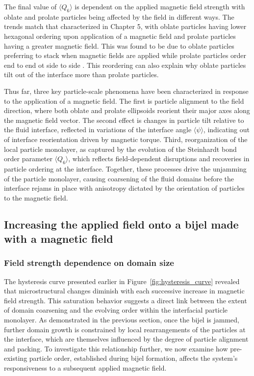 The final value of \(\langle Q_6 \rangle\) is dependent on the applied magnetic field strength with oblate and prolate particles being affected by the field in
different ways. The trends match that characterized in Chapter 5, with oblate particles having lower hexagonal ordering upon application of a magnetic field
and prolate particles having a greater magnetic field. This was found to be due to oblate particles preferring to stack when magnetic fields are applied while
prolate particles order end to end ot side to side \cite{dabat_mesoscale_2018, eatson_capillary_2023}. This reordering can also explain why oblate particles
tilt out of the interface more than prolate particles.

Thus far, three key particle-scale phenomena have been characterized in response to the application of a magnetic field. The first is
particle alignment to the field direction, where both oblate and prolate ellipsoids reorient their major axes along the magnetic field vector. The second effect is
changes in particle tilt relative to the fluid interface, reflected in variations of the interface angle \(\langle \psi \rangle\), indicating out of interface 
reorientation driven by magnetic torque. Third, reorganization of the local particle monolayer, as captured by the evolution of the Steinhardt bond order parameter 
\(\langle Q_6 \rangle\), which reflects field-dependent disruptions and recoveries in particle ordering at the interface. Together, these processes 
drive the unjamming of the particle monolayer, causing coarsening of the fluid domains before the interface rejams in place with anisotropy dictated by the orientation
of particles to the magnetic field.


\subsection{Increasing the applied field onto a bijel made with a magnetic field}
\subsubsection{Field strength dependence on domain size}
\label{section:increasing-the-applied-field}


The hysteresis curve presented earlier in Figure~\ref{fig:hysteresis_curve} revealed that microstructural changes diminish 
with each successive increase in magnetic field strength. This saturation behavior suggests a direct link between the extent of domain coarsening 
and the evolving order within the interfacial particle monolayer. As demonstrated in the previous section, once the bijel is jammed, further domain 
growth is constrained by local rearrangements of the particles at the interface, which are themselves influenced by the degree of particle alignment 
and packing. To investigate this relationship further, we now examine how pre-existing particle order, established during bijel formation, affects 
the system's responsiveness to a subsequent applied magnetic field.

